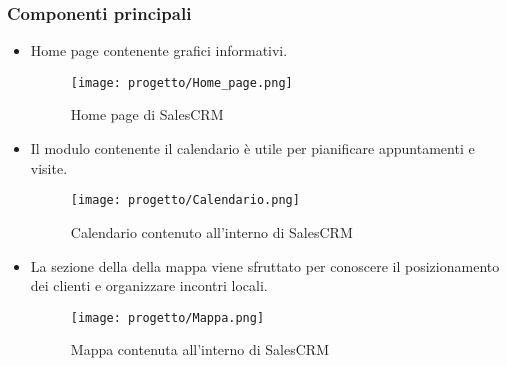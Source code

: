 \subsubsection{Componenti principali}
\begin{itemize}
    \item Home page contenente grafici informativi.
    
    \begin{figure}[!h] 
        \centering 
        \texttt{[image: progetto/Home\_page.png]} 
        \caption{Home page di SalesCRM}
      \end{figure}

    \item Il modulo contenente il calendario è utile per pianificare appuntamenti e visite.
    
    \begin{figure}[!h] 
        \centering 
        \texttt{[image: progetto/Calendario.png]} 
        \caption{Calendario contenuto all'interno di SalesCRM}
      \end{figure}

    \item La sezione della della mappa viene sfruttato per conoscere il posizionamento dei clienti e organizzare incontri locali.
    
    \begin{figure}[!h] 
        \centering 
        \texttt{[image: progetto/Mappa.png]} 
        \caption{Mappa contenuta all'interno di SalesCRM}
      \end{figure}
    
\end{itemize}

\newpage

